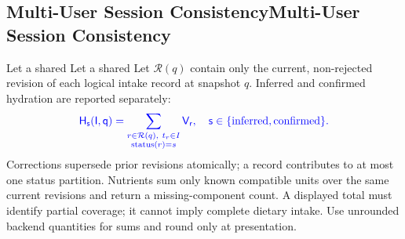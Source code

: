 \documentclass[conference]{IEEEtran}
\providecommand{\DIFadd}[1]{{\protect\color{blue} \sf #1}} %
\providecommand{\DIFdel}[1]{{\protect\color{red} \ifmmode #1\else\scriptsize #1\fi}} %
\providecommand{\DIFaddbegin}{} %
\providecommand{\DIFdelbegin}{} %
\providecommand{\DIFdelend}{} %
\begin{document}
\DIFdelbegin \subsection{\DIFdel{Multi-User Session Consistency}}
\addtocounter{subsection}{-1}%
\DIFdel{Let a shared }\DIFdelend \DIFaddbegin \DIFadd{Let $\mathcal R(q)$ contain only the current, non-rejected revision of each logical intake record at snapshot $q$. Inferred and confirmed hydration are reported separately:
}\begin{equation}\DIFadd{H_s(I,q)=\sum_{\substack{r\in\mathcal R(q),\ t_r\in I\\\operatorname{status}(r)=s}} V_r,
\quad s\in\{\mathrm{inferred},\mathrm{confirmed}\}.\label{eq:totals}}\end{equation}
\DIFadd{Corrections supersede prior revisions atomically; a record contributes to at most one status partition. Nutrients sum only known compatible units over the same current revisions and return a missing-component count. A displayed total must identify partial coverage; it cannot imply complete dietary intake. Use unrounded backend quantities for sums and round only at presentation.
}
\end{document}
